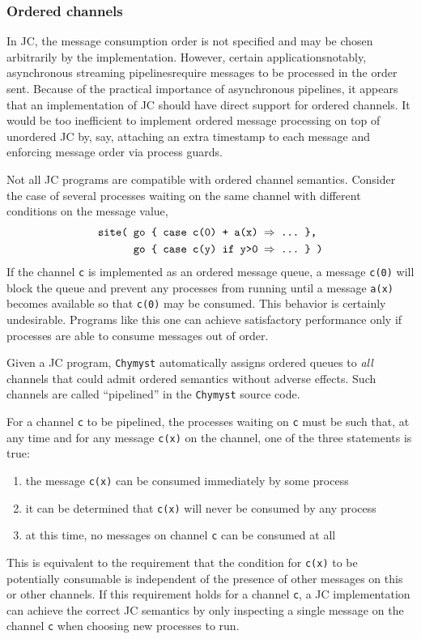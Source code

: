 \documentclass[sigplan,10pt,review,anonymous]{acmart}\settopmatter{printfolios=true}
\begin{document}
\subsubsection{Ordered channels}

In JC, the message consumption order is not specified and may be chosen
arbitrarily by the implementation. However, certain applications\textemdash notably,
asynchronous streaming pipelines\textemdash require messages to be
processed in the order sent. Because of the practical importance of
asynchronous pipelines, it appears that an implementation of JC should
have direct support for ordered channels. It would be too inefficient
to implement ordered message processing on top of unordered JC by,
say, attaching an extra timestamp to each message and enforcing message
order via process guards.

Not all JC programs are compatible with ordered channel semantics.
Consider the case of several processes waiting on the same channel
with different conditions on the message value, 
\begin{align*}
\text{\texttt{site( }} & \text{\texttt{go \{ case c(0) + a(x) \ensuremath{\Rightarrow} ...~\},}}\\
 & \text{\text{\texttt{go \{ case c(y) if y>0 }}\texttt{\ensuremath{\Rightarrow} ...~\} )}}
\end{align*}
If the channel \texttt{c} is implemented as an ordered message queue,
a message \texttt{c(0)} will block the queue and prevent any processes
from running until a message \texttt{a(x)} becomes available so that
\texttt{c(0)} may be consumed. This behavior is certainly undesirable.
Programs like this one can achieve satisfactory performance only if
processes are able to consume messages out of order.

Given a JC program, \texttt{Chymyst} automatically assigns ordered
queues to \emph{all} channels that could admit ordered semantics without
adverse effects. Such channels are called ``pipelined'' in the \texttt{Chymyst}
source code.

For a channel \texttt{c} to be pipelined, the processes waiting on
\texttt{c} must be such that, at any time and for any message \texttt{c(x)}
on the channel, one of the three statements is true:
\begin{enumerate}
\item the message \texttt{c(x)} can be consumed immediately by some process
\item it can be determined that \texttt{c(x)} will never be consumed by
any process
\item at this time, no messages on channel \texttt{c} can be consumed at
all
\end{enumerate}
This is equivalent to the requirement that the condition for \texttt{c(x)}
to be potentially consumable is independent of the presence of other
messages on this or other channels. If this requirement holds for
a channel \texttt{c}, a JC implementation can achieve the correct
JC semantics by only inspecting a single message on the channel \texttt{c}
when choosing new processes to run.
\end{document}
